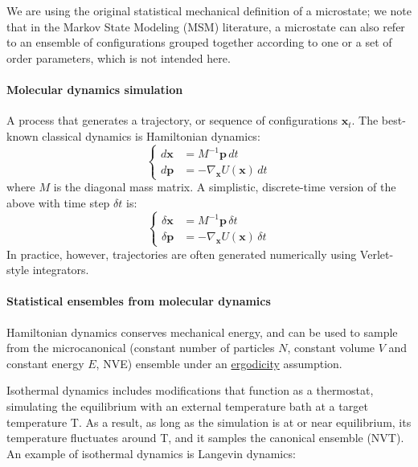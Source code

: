 \documentclass[9pt,review]{livecoms}
\newcommand{\vx}{\mathbf{x}}
\newcommand{\vp}{\mathbf{p}}
\begin{document}
We are using the original statistical mechanical definition of a microstate; we note that in the Markov State Modeling (MSM) literature, a microstate can also refer to an ensemble of configurations grouped together according to one or a set of order parameters, which is not intended here.

\hypertarget{ref:MolecularDynamics}{\paragraph{Molecular dynamics simulation}}
A process that generates a trajectory, or sequence of configurations $\vx_t$.
The best-known classical dynamics is Hamiltonian dynamics:
\begin{equation}
\left\{
\begin{array}{ll}
    d\vx &= M^{-1} \vp \,  dt \\
    d\vp &= -\nabla_\vx U(\vx) \, dt
\end{array}
\right.
    \label{eq:md}
\end{equation}
where $M$ is the diagonal mass matrix.
A simplistic, discrete-time version of the above with time step $\delta t$ is:
\begin{equation}
\left\{
\begin{array}{ll}
    \delta \vx &= M^{-1} \vp \, \delta t \\
    \delta \vp &= -\nabla_\vx U(\vx) \, \delta t
    \label{eq:md_discrete}
\end{array}
\right.
\end{equation}
In practice, however, trajectories are often generated numerically using Verlet-style integrators.


\hypertarget{ref:Ensemble} {\paragraph{Statistical ensembles from molecular dynamics}}
Hamiltonian dynamics conserves mechanical energy, and can be used to sample from the microcanonical (constant number of particles $N$, constant volume $V$ and constant energy $E$, NVE) ensemble under an \hyperlink{ref:ergodic} {ergodicity} assumption.

Isothermal dynamics includes modifications that function as a thermostat, simulating the equilibrium with an external temperature bath at a target temperature T.
As a result, as long as the simulation is at or near equilibrium, its temperature fluctuates around T, and it samples the canonical ensemble (NVT).
An example of isothermal dynamics is \hypertarget{ref:Langevin} {Langevin dynamics}:
\end{document}
